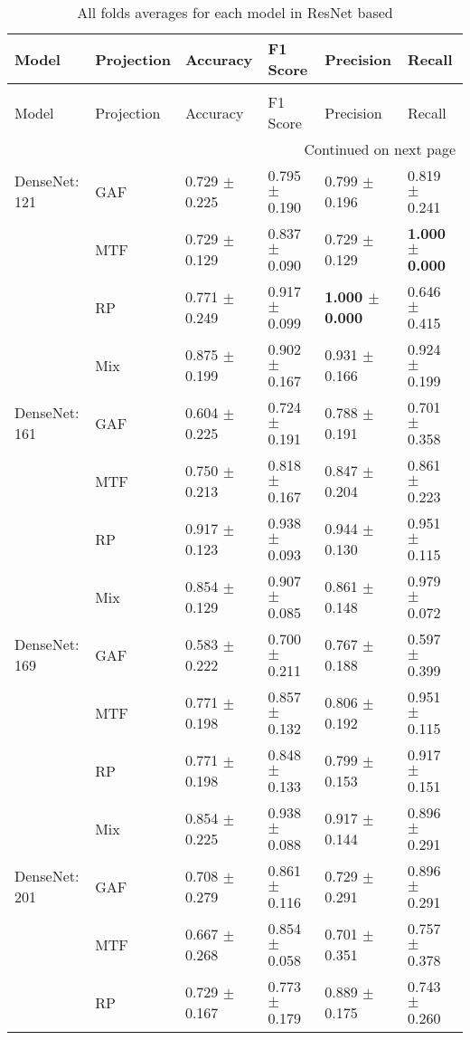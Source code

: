 \begin{longtable}[t]{llllll}
\caption{All folds averages for each model in ResNet based} \\
\toprule
Model & Projection & Accuracy & F1 Score & Precision & Recall \\
\midrule
\endfirsthead
\caption[]{All folds averages for each model in ResNet based} \\
\toprule
Model & Projection & Accuracy & F1 Score & Precision & Recall \\
\midrule
\endhead
\midrule
\multicolumn{6}{r}{Continued on next page} \\
\midrule
\endfoot
\bottomrule
\endlastfoot
DenseNet: 121 & GAF & 0.729 $\pm$ 0.225 & 0.795 $\pm$ 0.190 & 0.799 $\pm$ 0.196 & 0.819 $\pm$ 0.241 \\
 & MTF & 0.729 $\pm$ 0.129 & 0.837 $\pm$ 0.090 & 0.729 $\pm$ 0.129 & \textbf{1.000 $\pm$ 0.000} \\
 & RP & 0.771 $\pm$ 0.249 & 0.917 $\pm$ 0.099 & \textbf{1.000 $\pm$ 0.000} & 0.646 $\pm$ 0.415 \\
 & Mix & 0.875 $\pm$ 0.199 & 0.902 $\pm$ 0.167 & 0.931 $\pm$ 0.166 & 0.924 $\pm$ 0.199 \\
DenseNet: 161 & GAF & 0.604 $\pm$ 0.225 & 0.724 $\pm$ 0.191 & 0.788 $\pm$ 0.191 & 0.701 $\pm$ 0.358 \\
 & MTF & 0.750 $\pm$ 0.213 & 0.818 $\pm$ 0.167 & 0.847 $\pm$ 0.204 & 0.861 $\pm$ 0.223 \\
 & RP & 0.917 $\pm$ 0.123 & 0.938 $\pm$ 0.093 & 0.944 $\pm$ 0.130 & 0.951 $\pm$ 0.115 \\
 & Mix & 0.854 $\pm$ 0.129 & 0.907 $\pm$ 0.085 & 0.861 $\pm$ 0.148 & 0.979 $\pm$ 0.072 \\
DenseNet: 169 & GAF & 0.583 $\pm$ 0.222 & 0.700 $\pm$ 0.211 & 0.767 $\pm$ 0.188 & 0.597 $\pm$ 0.399 \\
 & MTF & 0.771 $\pm$ 0.198 & 0.857 $\pm$ 0.132 & 0.806 $\pm$ 0.192 & 0.951 $\pm$ 0.115 \\
 & RP & 0.771 $\pm$ 0.198 & 0.848 $\pm$ 0.133 & 0.799 $\pm$ 0.153 & 0.917 $\pm$ 0.151 \\
 & Mix & 0.854 $\pm$ 0.225 & 0.938 $\pm$ 0.088 & 0.917 $\pm$ 0.144 & 0.896 $\pm$ 0.291 \\
DenseNet: 201 & GAF & 0.708 $\pm$ 0.279 & 0.861 $\pm$ 0.116 & 0.729 $\pm$ 0.291 & 0.896 $\pm$ 0.291 \\
 & MTF & 0.667 $\pm$ 0.268 & 0.854 $\pm$ 0.058 & 0.701 $\pm$ 0.351 & 0.757 $\pm$ 0.378 \\
 & RP & 0.729 $\pm$ 0.167 & 0.773 $\pm$ 0.179 & 0.889 $\pm$ 0.175 & 0.743 $\pm$ 0.260 \\

\end{longtable}
